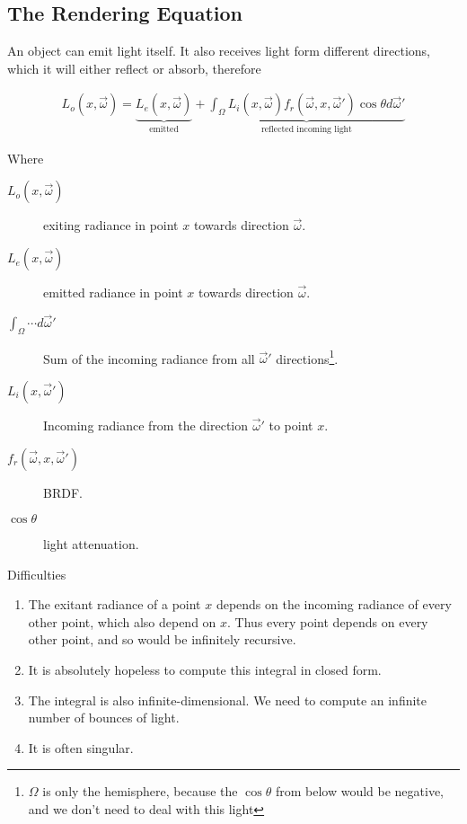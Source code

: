 \documentclass[../pbr.tex]{subfile}
\begin{document}
\subsection{The Rendering Equation}%
\label{sub:the_rendering_equation}

An object can emit light itself. It also receives light form different
directions, which it will either reflect or absorb, therefore

\begin{Figure}
  \begin{center}
    
  \end{center}
  \label{fig:03_3}
\end{Figure}

\begin{align*}
  L_o\left(x,\vec{\omega}\right)=\underbrace{L_e\left(x,\vec{\omega}\right)}_\text{emitted}+\underbrace{\int_\Omega
    L_i\left(x,\vec{\omega}\right)f_r\left(\vec{\omega},x,\vec{\omega}'\right)\cos\theta
    d\vec{\omega}'}_\text{reflected incoming light}
\end{align*}

Where
\begin{description}
  \item[$L_o\left(x,\vec{\omega}\right)$] exiting radiance in point $x$ towards
    direction $\vec{\omega}$.
  \item[$L_e\left(x,\vec{\omega}\right)$] emitted radiance in point $x$ towards
    direction $\vec{\omega}$.
  \item[$\int_\Omega\cdots d\vec{\omega}'$] Sum of the incoming radiance from
    all $\vec{\omega}'$ directions\footnote{$\Omega$ is only the hemisphere,
      because the $\cos\theta$ from below would be negative, and we don't need
      to deal with this light}.
  \item[$L_i\left(x,\vec{\omega}'\right)$] Incoming radiance from the direction
    $\vec{\omega}'$ to point $x$.
  \item[$f_r\left(\vec{\omega},x,\vec{\omega}'\right)$] BRDF.
  \item[$\cos\theta$] light attenuation.
\end{description}

Difficulties
\begin{enumerate}
  \item The exitant radiance of a point $x$ depends on the incoming radiance of
    every other point, which also depend on $x$. Thus every point depends on
    every other point, and so would be infinitely recursive.
  \item It is absolutely hopeless to compute this integral in closed form.
  \item The integral is also infinite-dimensional. We need to compute an
    infinite number of bounces of light.
  \item It is often singular.
\end{enumerate}
\end{document}
